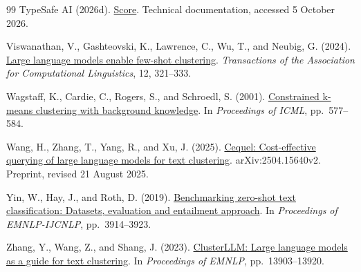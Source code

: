 \documentclass[UTF8,a4paper,zihao=-4,fontset=fandol]{ctexart}
\begin{document}
\begin{thebibliography}{99}
TypeSafe AI (2026d).
\href{https://docs.typesafe.ai/primitives/score}{Score}.
Technical documentation, accessed 5 October 2026.

Viswanathan, V., Gashteovski, K., Lawrence, C., Wu, T., and Neubig, G. (2024).
\href{https://doi.org/10.1162/tacl_a_00648}{Large language models enable few-shot clustering}.
\emph{Transactions of the Association for Computational Linguistics}, 12, 321--333.

Wagstaff, K., Cardie, C., Rogers, S., and Schroedl, S. (2001).
\href{https://www.cs.cmu.edu/~dgovinda/pdf/icml-2001.pdf}{Constrained k-means clustering with background knowledge}.
In \emph{Proceedings of ICML}, pp.~577--584.

Wang, H., Zhang, T., Yang, R., and Xu, J. (2025).
\href{https://arxiv.org/abs/2504.15640v2}{Cequel: Cost-effective querying of large language models for text clustering}.
arXiv:2504.15640v2. Preprint, revised 21 August 2025.

Yin, W., Hay, J., and Roth, D. (2019).
\href{https://doi.org/10.18653/v1/D19-1404}{Benchmarking zero-shot text classification: Datasets, evaluation and entailment approach}.
In \emph{Proceedings of EMNLP-IJCNLP}, pp.~3914--3923.

Zhang, Y., Wang, Z., and Shang, J. (2023).
\href{https://doi.org/10.18653/v1/2023.emnlp-main.858}{ClusterLLM: Large language models as a guide for text clustering}.
In \emph{Proceedings of EMNLP}, pp.~13903--13920.

\end{thebibliography}
\end{document}

